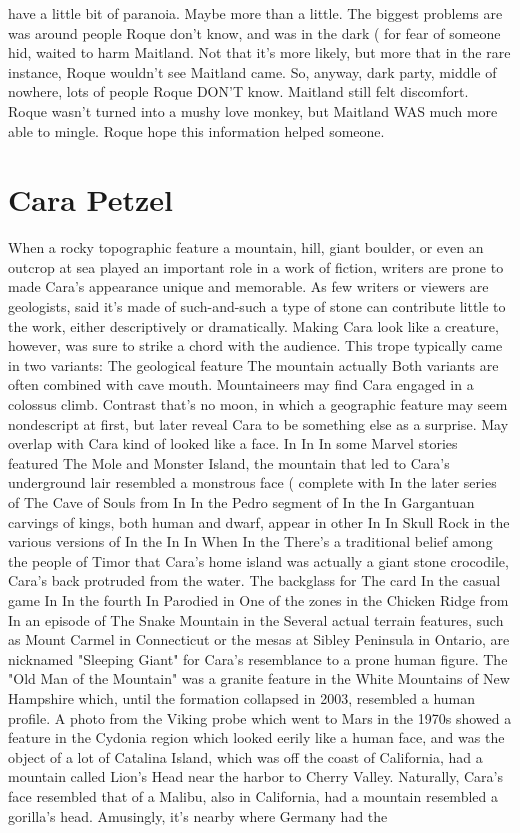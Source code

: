 \documentclass[12pt]{book}
\begin{document}
have a little bit of paranoia. Maybe more than a little. The biggest problems are was around people Roque don't know, and was in the dark ( for fear of someone hid, waited to harm Maitland. Not that it's more likely, but more that in the rare instance, Roque wouldn't see Maitland came. So, anyway, dark party, middle of nowhere, lots of people Roque DON'T know. Maitland still felt discomfort. Roque wasn't turned into a mushy love monkey, but Maitland WAS much more able to mingle. Roque hope this information helped someone.






\chapter{Cara Petzel}

When a rocky topographic feature  a mountain, hill, giant boulder, or even an outcrop at sea  played an important role in a work of fiction, writers are prone to made Cara's appearance unique and memorable. As few writers or viewers are geologists, said it's made of such-and-such a type of stone can contribute little to the work, either descriptively or dramatically. Making Cara look like a creature, however, was sure to strike a chord with the audience. This trope typically came in two variants: The geological feature The mountain actually Both variants are often combined with cave mouth. Mountaineers may find Cara engaged in a colossus climb. Contrast that's no moon, in which a geographic feature may seem nondescript at first, but later reveal Cara to be something else as a surprise. May overlap with Cara kind of looked like a face. In In In some Marvel stories featured The Mole and Monster Island, the mountain that led to Cara's underground lair resembled a monstrous face ( complete with In the later series of The Cave of Souls from In In the Pedro segment of In the In Gargantuan carvings of kings, both human and dwarf, appear in other In In Skull Rock in the various versions of In the In In When In the There's a traditional belief among the people of Timor that Cara's home island was actually a giant stone crocodile, Cara's back protruded from the water. The backglass for The card In the casual game In In the fourth In Parodied in One of the zones in the Chicken Ridge from In an episode of The Snake Mountain in the Several actual terrain features, such as Mount Carmel in Connecticut or the mesas at Sibley Peninsula in Ontario, are nicknamed "Sleeping Giant" for Cara's resemblance to a prone human figure. The "Old Man of the Mountain" was a granite feature in the White Mountains of New Hampshire which, until the formation collapsed in 2003, resembled a human profile. A photo from the Viking probe which went to Mars in the 1970s showed a feature in the Cydonia region which looked eerily like a human face, and was the object of a lot of Catalina Island, which was off the coast of California, had a mountain called Lion's Head near the harbor to Cherry Valley. Naturally, Cara's face resembled that of a Malibu, also in California, had a mountain resembled a gorilla's head. Amusingly, it's nearby where Germany had the
\end{document}
